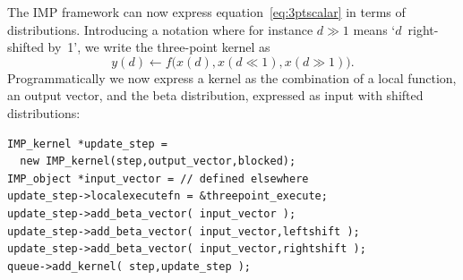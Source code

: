 The \ac{IMP} framework can now express equation~\eqref{eq:3ptscalar}
in terms of distributions. 
Introducing a notation where for instance $d\gg1$ means `$d$~right-shifted by~1',
we write the three-point kernel as
\[ y(d) \leftarrow f\bigl( x(d),x(d\ll1),x(d\gg1) \bigr). \]
Programmatically we now express
a kernel as the combination of a local function, an output vector,
and the beta distribution, expressed as input with shifted distributions:
\begin{verbatim}
IMP_kernel *update_step = 
  new IMP_kernel(step,output_vector,blocked);
IMP_object *input_vector = // defined elsewhere
update_step->localexecutefn = &threepoint_execute;
update_step->add_beta_vector( input_vector );
update_step->add_beta_vector( input_vector,leftshift );
update_step->add_beta_vector( input_vector,rightshift );
queue->add_kernel( step,update_step );
\end{verbatim}

